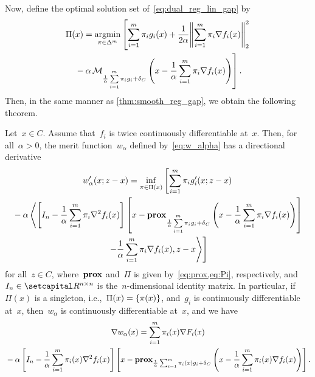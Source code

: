 \documentclass[../../main]{subfiles}
\begin{document}
                        Now, define the optimal solution set of~\cref{eq:dual_reg_lin_gap} by
                        \begin{multline} \label{eq:Pi}
                            \Pi(x) = \argmin_{\pi \in \Delta^m} \left[ \sum_{i = 1}^{m} \pi_i g_i(x) + \frac{1}{2 \alpha} \norm*{\sum_{i = 1}^{m} \pi_i \nabla f_i(x)}_2^2 \right. \\
                            \left. {}- \alpha \envelope_{\frac{1}{\alpha} \sum\limits_{i = 1}^{m} \pi_i g_i + \indicator_C}\left( x - \frac{1}{\alpha} \sum_{i = 1}^{m} \pi_i \nabla f_i(x) \right) \right] 
                        .\end{multline} 
                        Then, in the same manner as \cref{thm:smooth_reg_gap}, we obtain the following theorem.
                        \begin{theorem} \label{thm:smooth_reg_lin_gap}
                            Let~$x \in C$.
                            Assume that~$f_i$ is twice continuously differentiable at~$x$.
                            Then, for all~$\alpha > 0$, the merit function~$w_\alpha$ defined by~\cref{eq:w_alpha} has a directional derivative
                            \begin{multline}
                                w_\alpha'(x; z - x) = \inf_{\pi \in \Pi(x)} \left[ \sum_{i = 1}^{m} \pi_i g_i'(x; z - x) \right. \\
                                {}- \alpha \left\langle \left[ I_n - \frac{1}{\alpha} \sum_{i = 1}^{m} \pi_i \nabla^2 f_i(x) \right] \left[x - \prox_{\frac{1}{\alpha} \sum\limits_{i = 1}^{m} \pi_i g_i + \indicator_C} \left( x - \frac{1}{\alpha} \sum_{i = 1}^{m} \pi_i \nabla f_i(x) \right) \right] \right.\\
                                \left. \left.- \frac{1}{\alpha} \sum_{i = 1}^{m} \pi_i \nabla f_i(x) , z - x \right\rangle \right] 
                            \end{multline}
                            for all~$z \in C$, where~$\prox$ and~$\Pi$ is given by~\cref{eq:prox,eq:Pi}, respectively, and~$I_n \in \setR^{n \times n}$ is the~$n$-dimensional identity matrix.
                            In particular, if~$\Pi(x)$ is a singleton, i.e.,~$\Pi(x) = \set*{\pi(x)}$, and~$g_i$ is continuously differentiable at~$x$, then~$w_\alpha$ is continuously differentiable at~$x$, and we have
                            \begin{multline}
                                \nabla w_\alpha(x) = \sum_{i = 1}^{m} \pi_i(x) \nabla F_i(x) \\
                                {}- \alpha \left[ I_n - \frac{1}{\alpha} \sum_{i = 1}^{m} \pi_i(x) \nabla^2 f_i(x) \right] \left[x - \prox_{\frac{1}{\alpha} \sum_{i = 1}^{m} \pi_i(x) g_i + \indicator_C} \left( x - \frac{1}{\alpha} \sum_{i = 1}^{m} \pi_i(x) \nabla f_i(x) \right) \right]
                            .\end{multline}
                        \end{theorem}
\end{document}
